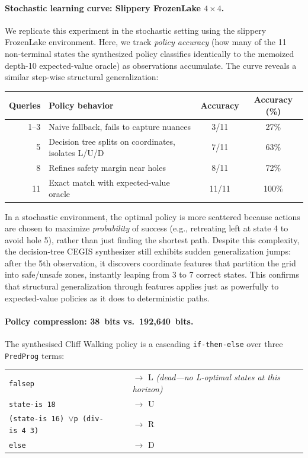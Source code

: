 \paragraph{Stochastic learning curve: Slippery FrozenLake $4{\times}4$.}
We replicate this experiment in the stochastic setting using the slippery FrozenLake environment. Here, we track \emph{policy accuracy} (how many of the 11 non-terminal states the synthesized policy classifies identically to the memoized depth-10 expected-value oracle) as observations accumulate. The curve reveals a similar step-wise structural generalization:
\begin{center}
\small
\begin{tabular}{@{}rlcc@{}}
\textbf{Queries} & \textbf{Policy behavior} & \textbf{Accuracy} & \textbf{Accuracy (\%)} \\
\hline
1--3 & Naive fallback, fails to capture nuances & 3/11 & 27\% \\
5 & Decision tree splits on coordinates, isolates L/U/D & 7/11 & 63\% \\
8 & Refines safety margin near holes & 8/11 & 72\% \\
11 & Exact match with expected-value oracle & 11/11 & 100\% \\
\end{tabular}
\end{center}
In a stochastic environment, the optimal policy is more scattered because actions are chosen to maximize \emph{probability} of success (e.g., retreating left at state 4 to avoid hole 5), rather than just finding the shortest path. Despite this complexity, the decision-tree CEGIS synthesizer still exhibits sudden generalization jumps: after the 5th observation, it discovers coordinate features that partition the grid into safe/unsafe zones, instantly leaping from 3 to 7 correct states. This confirms that structural generalization through features applies just as powerfully to expected-value policies as it does to deterministic paths.

\paragraph{Policy compression: 38~bits vs.\ 192{,}640~bits.}
The synthesised Cliff Walking policy is a cascading \texttt{if-then-else} over three \texttt{PredProg} terms:

\begin{center}
\small
\begin{tabular}{@{}ll@{}}
\texttt{falsep} & $\to$ L \quad\emph{(dead---no L-optimal states at this horizon)} \\
\texttt{state-is~18} & $\to$ U \\
\texttt{(state-is~16) $\vee$p (div-is~4~3)} & $\to$ R \\
\texttt{else} & $\to$ D \\
\end{tabular}
\end{center}

